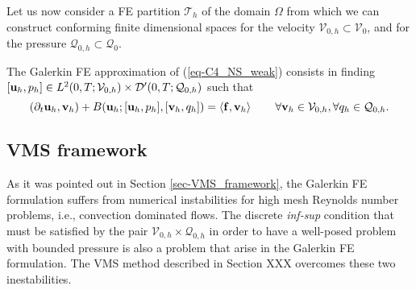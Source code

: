 Let us now consider a FE partition $\mathcal{T}_h$ of the domain $\Omega$ from which we can construct conforming finite dimensional spaces for the velocity $\mathcal{V}_{0,h} \subset \mathcal{V}_0$, and for the pressure $\mathcal{Q}_{0,h}\subset \mathcal{Q}_0$. 

The Galerkin FE approximation of (\ref{eq-C4_NS_weak}) consists in finding $[{\bf u}_h,p_h]\in {L}^2(0,T;\mathcal{V}_{0,h})\times {\cal D}'(0,T;\mathcal{Q}_{0,h})$ such that
\begin{equation}
\label{eq-C4_NS_galerkin}
(\partial_t{\bf u}_h,{\bf v}_h) + B({\bf u}_h;[{\bf u}_h,p_h],[{\bf v}_h,q_h]) =\left<{\bf f},{\bf v}_h\right>
\quad\quad\forall{\bf v}_h\in\mathcal{V}_{0,h},\forall q_h\in\mathcal{Q}_{0,h}.
\end{equation}

\subsection{VMS framework}
\label{subsec-C4_C4_VMS_framework}
As it was pointed out in Section \ref{sec-VMS_framework}, the Galerkin FE formulation  suffers from numerical instabilities for high mesh Reynolds number problems, i.e., convection dominated flows. The discrete \textit{inf-sup} condition that must be satisfied by the pair $\mathcal{V}_{0,h} \times\mathcal{Q}_{0,h}$ in order to have a well-posed problem with bounded pressure is also a problem that arise in the Galerkin FE formulation. The VMS method described in Section XXX overcomes these two inestabilities.

